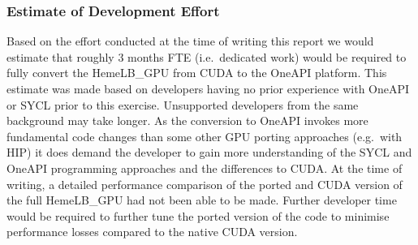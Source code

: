 \documentclass[../main]{subfiles}
\begin{document}
\subsubsection{Estimate of Development Effort}
Based on the effort conducted at the time of writing this report we would estimate that roughly 3 months FTE (i.e.\ dedicated work) would be required to fully convert the HemeLB\_GPU from CUDA to the OneAPI platform.
This estimate was made based on developers having no prior experience with OneAPI or SYCL prior to this exercise.
Unsupported developers from the same background may take longer.
As the conversion to OneAPI invokes more fundamental code changes than some other GPU porting approaches (e.g.\ with HIP) it does demand the developer to gain more understanding of the SYCL and OneAPI programming approaches and the differences to CUDA.
At the time of writing, a detailed performance comparison of the ported and CUDA version of the full HemeLB\_GPU had not been able to be made.
Further developer time would be required to further tune the ported version of the code to minimise performance losses compared to the native CUDA version.
\end{document}
